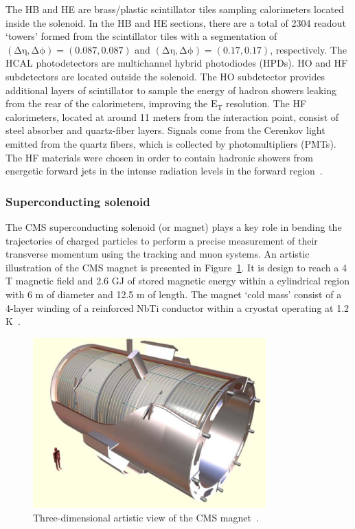 The HB and HE are brass/plastic scintillator tiles sampling calorimeters located inside the solenoid. In the HB and HE sections, there are a total of 2304 readout `towers' formed from the scintillator tiles with a  segmentation of $\mathrm{(\Delta\eta,\Delta\phi)=(0.087,0.087)}$ and $\mathrm{(\Delta\eta,\Delta\phi)=(0.17,0.17)}$, respectively. The HCAL photodetectors are multichannel hybrid photodiodes (HPDs). HO and HF subdetectors are located outside the solenoid. The HO subdetector provides additional layers of scintillator to sample the energy of hadron showers leaking from the rear of the calorimeters, improving the $\mathrm{E_{T}}$ resolution. The HF calorimeters, located at around 11 meters from the interaction point, consist of steel absorber and quartz-fiber layers. Signals come from the Cerenkov light emitted from the quartz fibers, which is collected by photomultipliers (PMTs). The HF materials were chosen in order to contain hadronic showers from energetic forward jets in the intense radiation levels in the forward region~\cite{CMS:2008xjf,CMS:2006myw}.

\subsubsection{Superconducting solenoid}
The CMS superconducting solenoid (or magnet) plays a key role in bending the trajectories of charged particles to perform a precise measurement of their transverse momentum using the tracking and muon systems.  An artistic illustration of the CMS magnet is presented in Figure~\ref{fig:cmsmagnet}. It is design to reach a 4 T magnetic field and 2.6 GJ of stored magnetic energy within a cylindrical region with 6 m of diameter and 12.5 m of length. The magnet `cold mass' consist of a 4-layer winding of a reinforced NbTi conductor within a cryostat operating at 1.2 K~\cite{CMS:2008xjf,CMS:2006myw}. 

\begin{figure}[htp!]
\centering
\includegraphics[width=0.8\textwidth]{Figures/Apparatus/cmsmagnet.png}
\caption[Three-dimensional artistic view of the CMS magnet]{Three-dimensional artistic view of the CMS magnet~\cite{CMS:2008xjf}.}
\label{fig:cmsmagnet}
\end{figure}


